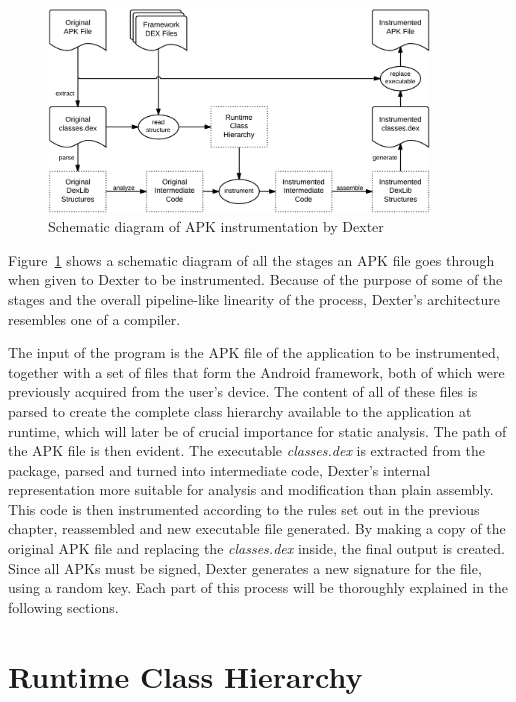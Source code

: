 \documentclass[12pt,twoside,notitlepage]{report}
\begin{document}
\begin{figure}
	\centerline{	
		\includegraphics[width=0.9\textwidth]{figs/fig_implementation_overview.png}
	}
	\caption{Schematic diagram of APK instrumentation by Dexter}
	\label{fig:Implementation_Overview}
\end{figure}

Figure~\ref{fig:Implementation_Overview} shows a schematic diagram of all the stages an APK file goes through when given to Dexter to be instrumented. Because of the purpose of some of the stages and the overall pipeline-like linearity of the process, Dexter's architecture resembles one of a compiler. 

The input of the program is the APK file of the application to be instrumented, together with a set of files that form the Android framework, both of which were previously acquired from the user's device. The content of all of these files is parsed to create the complete class hierarchy available to the application at runtime, which will later be of crucial importance for static analysis. The path of the APK file is then evident. The executable \emph{classes.dex} is extracted from the package, parsed and turned into intermediate code, Dexter's internal representation more suitable for analysis and modification than plain assembly. This code is then instrumented according to the rules set out in the previous chapter, reassembled and new executable file generated. By making a copy of the original APK file and replacing the \emph{classes.dex} inside, the final output is created. Since all APKs must be signed, Dexter generates a new signature for the file, using a random key. Each part of this process will be thoroughly explained in the following sections.

\section{Runtime Class Hierarchy}
\end{document}
